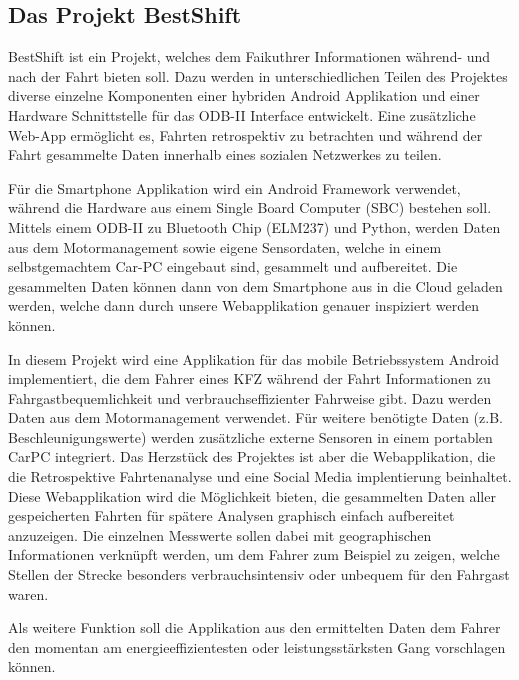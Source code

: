 \subsection{Das Projekt BestShift}

BestShift ist ein Projekt, welches dem Faikuthrer Informationen während- und nach der Fahrt bieten soll. 
Dazu werden in unterschiedlichen Teilen des Projektes 
diverse einzelne Komponenten einer hybriden Android Applikation und einer Hardware Schnittstelle für das ODB-II 
Interface entwickelt. 
Eine zusätzliche Web-App ermöglicht es, Fahrten retrospektiv zu betrachten und während der Fahrt gesammelte Daten innerhalb eines sozialen Netzwerkes zu teilen.
 

Für die Smartphone Applikation wird ein Android Framework verwendet, 
während die Hardware aus einem Single Board Computer (SBC) bestehen soll. 
Mittels einem ODB-II zu Bluetooth Chip (ELM237) und Python, 
werden Daten aus dem Motormanagement sowie eigene Sensordaten, welche in einem selbstgemachtem Car-PC eingebaut sind,
gesammelt und aufbereitet. 
Die gesammelten Daten können dann von dem Smartphone aus in die Cloud geladen werden, welche dann durch unsere
Webapplikation genauer inspiziert werden können.

In diesem Projekt wird eine Applikation für das mobile Betriebssystem Android implementiert, 
die dem Fahrer eines KFZ während der Fahrt Informationen zu Fahrgastbequemlichkeit und verbrauchseffizienter Fahrweise gibt. 
Dazu werden Daten aus dem Motormanagement verwendet. 
Für weitere benötigte Daten (z.B. Beschleunigungswerte) werden zusätzliche externe Sensoren in einem portablen CarPC integriert. 
Das Herzstück des Projektes ist aber die Webapplikation, die die Retrospektive Fahrtenanalyse und eine Social Media implentierung beinhaltet.
Diese Webapplikation wird die Möglichkeit bieten, die gesammelten Daten aller gespeicherten 
Fahrten für spätere Analysen graphisch einfach aufbereitet anzuzeigen. 
Die einzelnen Messwerte sollen dabei mit geographischen Informationen verknüpft werden, 
um dem Fahrer zum Beispiel zu zeigen, welche Stellen der Strecke besonders verbrauchsintensiv oder unbequem für den Fahrgast waren. 

Als weitere Funktion soll die Applikation aus den ermittelten Daten dem Fahrer den 
momentan am energieeffizientesten oder leistungsstärksten Gang vorschlagen können.
\clearpage %